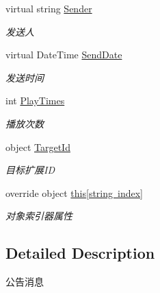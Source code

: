 \begin{DoxyCompactItemize}
virtual string \mbox{\hyperlink{class_t_net_1_1_message_1_1_notice_message_abe7eae140980980a3fd7b01da991567b}{Sender}}
\begin{DoxyCompactList}\small\item\em 发送人 \end{DoxyCompactList}\item 
virtual Date\+Time \mbox{\hyperlink{class_t_net_1_1_message_1_1_notice_message_afd8412e3cb2d511733b1c264ff45a13a}{Send\+Date}}
\begin{DoxyCompactList}\small\item\em 发送时间 \end{DoxyCompactList}\item 
int \mbox{\hyperlink{class_t_net_1_1_message_1_1_notice_message_ad0851a3258fdb57c310b61e72ef86e2b}{Play\+Times}}
\begin{DoxyCompactList}\small\item\em 播放次数 \end{DoxyCompactList}\item 
object \mbox{\hyperlink{class_t_net_1_1_message_1_1_notice_message_a9333b08c8bc80912e36337ffe04cfb5c}{Target\+Id}}
\begin{DoxyCompactList}\small\item\em 目标扩展\+ID \end{DoxyCompactList}\item 
override object \mbox{\hyperlink{class_t_net_1_1_message_1_1_notice_message_a143f03488d8b532cc9207d1e40639e23}{this\mbox{[}string index\mbox{]}}}
\begin{DoxyCompactList}\small\item\em 对象索引器属性 \end{DoxyCompactList}\end{DoxyCompactItemize}


\subsection{Detailed Description}
公告消息 



